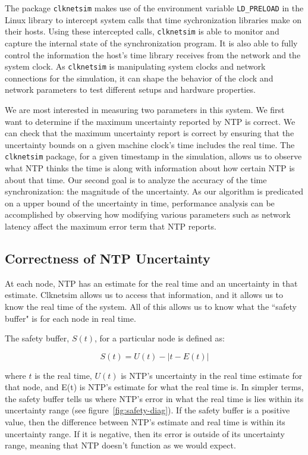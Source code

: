 The package \texttt{clknetsim} makes use of the environment variable \texttt{LD\_PRELOAD} in
the Linux library to intercept system calls that time sychronization 
libraries make on their hosts. Using these intercepted calls, 
\texttt{clknetsim} is able to monitor and capture the internal state of
the synchronization program. It is also able to fully control the
information the host's time library receives from the network and the system
clock. As \texttt{clknetsim} is manipulating system clocks and network
connections for the simulation, it can shape the behavior of the clock
and network parameters to test different setups and hardware properties. 

We are most interested in measuring two parameters in
this system. We first want to determine if the maximum uncertainty
reported by NTP is correct. We can check that the maximum uncertainty
report is correct by ensuring that the uncertainty bounds on a given machine
clock's time includes the real time.
The \texttt{clknetsim} package, for a
given timestamp in the simulation, allows us to observe what NTP
thinks the time is along with information about how certain NTP is
about that time. Our second goal is to analyze the accuracy of the time
synchronization: the magnitude of the uncertainty. 
As our algorithm is predicated on a upper
bound of the uncertainty in time, performance analysis can be
accomplished by observing how modifying various parameters such as
network latency affect the maximum error term that NTP reports.

\subsection{Correctness of NTP Uncertainty}

At each node, NTP has an estimate for the real time and an uncertainty
in that estimate. Clknetsim allows us to access that information, and
it allows us to know the real time of the system. All of this allows
us to know what the ``safety buffer" is for each node in real time.

The safety buffer, $S(t)$,  for a particular node is defined as:

\[ S(t) = U(t) - | t - E(t)| \]

where $t$ is the real time, $U(t)$ is NTP's uncertainty in the real
time estimate for that node, and E(t) is NTP's estimate for what the
real time is. In simpler terms, the safety buffer tells us where NTP's
error in what the real time is lies within its uncertainty range (see
figure~\ref{fig:safety-diag}). If the safety buffer is a positive
value, then the difference between NTP's estimate and real time is
within its uncertainty range. If it is negative, then its error is
outside of its uncertainty range, meaning that NTP doesn't function as
we would expect.


